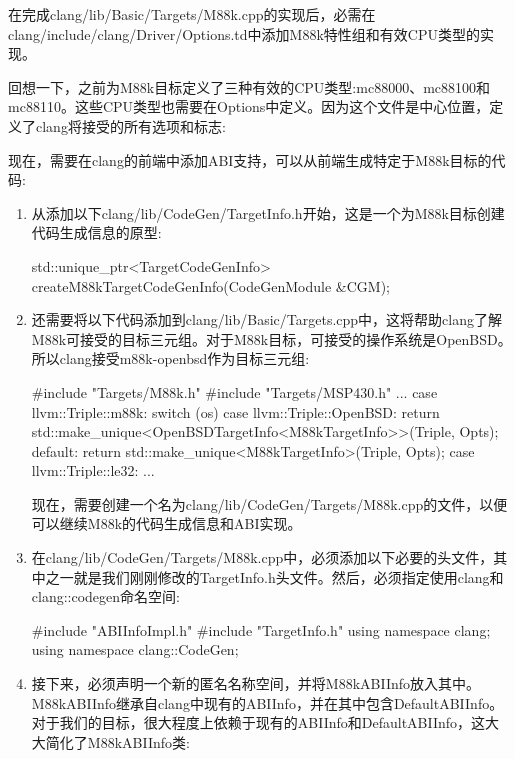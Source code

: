 在完成clang/lib/Basic/Targets/M88k.cpp的实现后，必需在clang/include/clang/Driver/Options.td中添加M88k特性组和有效CPU类型的实现。

回想一下，之前为M88k目标定义了三种有效的CPU类型:mc88000、mc88100和mc88110。这些CPU类型也需要在Options中定义。因为这个文件是中心位置，定义了clang将接受的所有选项和标志:


现在，需要在clang的前端中添加ABI支持，可以从前端生成特定于M88k目标的代码:

\begin{enumerate}
\item
从添加以下clang/lib/CodeGen/TargetInfo.h开始，这是一个为M88k目标创建代码生成信息的原型:

\begin{cpp}
std::unique_ptr<TargetCodeGenInfo>
createM88kTargetCodeGenInfo(CodeGenModule &CGM);
\end{cpp}

\item
还需要将以下代码添加到clang/lib/Basic/Targets.cpp中，这将帮助clang了解M88k可接受的目标三元组。对于M88k目标，可接受的操作系统是OpenBSD。所以clang接受m88k-openbsd作为目标三元组:

\begin{cpp}
#include "Targets/M88k.h"
#include "Targets/MSP430.h"
...
    case llvm::Triple::m88k:
        switch (os) {
            case llvm::Triple::OpenBSD:
            return std::make_unique<OpenBSDTargetInfo<M88kTargetInfo>>(Triple, Opts);
        default:
            return std::make_unique<M88kTargetInfo>(Triple, Opts);
        }
    case llvm::Triple::le32:
...
\end{cpp}

现在，需要创建一个名为clang/lib/CodeGen/Targets/M88k.cpp的文件，以便可以继续M88k的代码生成信息和ABI实现。

\item
在clang/lib/CodeGen/Targets/M88k.cpp中，必须添加以下必要的头文件，其中之一就是我们刚刚修改的TargetInfo.h头文件。然后，必须指定使用clang和clang::codegen命名空间:

\begin{cpp}
#include "ABIInfoImpl.h"
#include "TargetInfo.h"
using namespace clang;
using namespace clang::CodeGen;
\end{cpp}

\item
接下来，必须声明一个新的匿名名称空间，并将M88kABIInfo放入其中。M88kABIInfo继承自clang中现有的ABIInfo，并在其中包含DefaultABIInfo。对于我们的目标，很大程度上依赖于现有的ABIInfo和DefaultABIInfo，这大大简化了M88kABIInfo类:


\end{enumerate}

